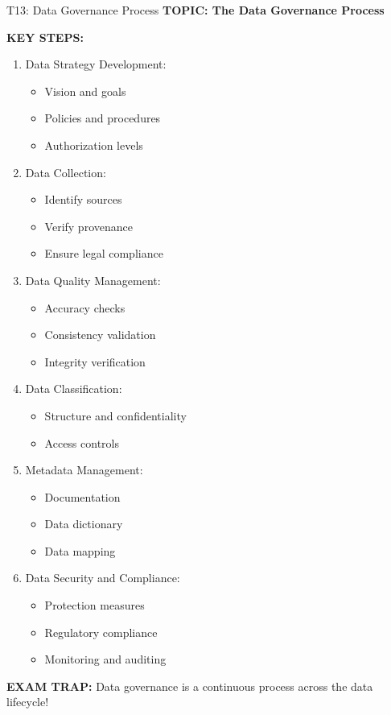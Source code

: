 \documentclass[8pt]{beamer}
\begin{document}
	\begin{frame}{T13: Data Governance Process}
		\fontsize{6.5}{7.5}\selectfont
		\textbf{TOPIC: The Data Governance Process}
		
		\vspace{0.1cm}
		\textbf{KEY STEPS:}
		\begin{enumerate}
			\item \textcolor{myblue}{Data Strategy Development:}
			\begin{itemize}
				\item Vision and goals
				\item Policies and procedures
				\item Authorization levels
			\end{itemize}
			\item \textcolor{myblue}{Data Collection:}
			\begin{itemize}
				\item Identify sources
				\item Verify provenance
				\item Ensure legal compliance
			\end{itemize}
			\item \textcolor{myblue}{Data Quality Management:}
			\begin{itemize}
				\item Accuracy checks
				\item Consistency validation
				\item Integrity verification
			\end{itemize}
			\item \textcolor{myblue}{Data Classification:}
			\begin{itemize}
				\item Structure and confidentiality
				\item Access controls
			\end{itemize}
			\item \textcolor{myblue}{Metadata Management:}
			\begin{itemize}
				\item Documentation
				\item Data dictionary
				\item Data mapping
			\end{itemize}
			\item \textcolor{myblue}{Data Security and Compliance:}
			\begin{itemize}
				\item Protection measures
				\item Regulatory compliance
				\item Monitoring and auditing
			\end{itemize}
		\end{enumerate}
		
		\textcolor{myred}{\textbf{EXAM TRAP:}} Data governance is a \textcolor{myblue}{continuous process across the data lifecycle}!
	\end{frame}
	
\end{document}
